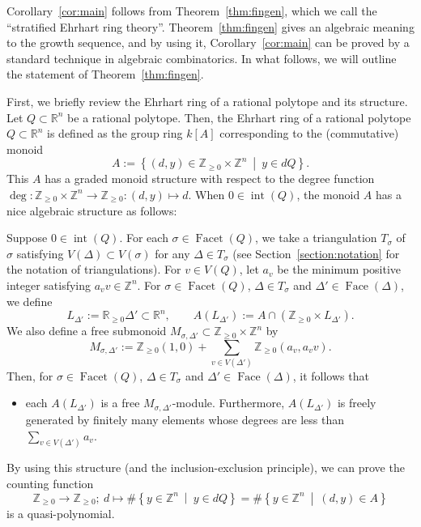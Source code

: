 Corollary~\ref{cor:main} follows from Theorem~\ref{thm:fingen}, which we call the ``stratified Ehrhart ring theory''.
Theorem~\ref{thm:fingen} gives an algebraic meaning to the growth sequence, and by using it, 
Corollary~\ref{cor:main} can be proved by a standard technique in algebraic combinatorics. 
In what follows, we will outline the statement of Theorem~\ref{thm:fingen}. 

First, we briefly review the Ehrhart ring of a rational polytope and its structure.
Let $Q \subset \mathbb{R}^n$ be a rational polytope. 
Then, the Ehrhart ring of a rational polytope $Q \subset \mathbb{R}^n$ is defined as the group ring $k[A]$ corresponding to the (commutative) monoid
\[
A := \left \{ (d, y) \in \mathbb{Z}_{\ge 0} \times \mathbb{Z}^n \ \middle | \ y \in dQ\right \}. 
\]
This $A$ has a graded monoid structure with respect to the degree function $\operatorname{deg}: \mathbb{Z}_{\ge 0} \times \mathbb{Z}^n \to \mathbb{Z}_{\ge 0}: (d,y) \mapsto d$. 
When $0 \in \operatorname{int}(Q)$, the monoid $A$ has a nice algebraic structure as follows: 
 
\begin{fact}[{cf.\ \cite[Section 3.2]{BR}}]\label{fact}
Suppose $0 \in \operatorname{int}(Q)$. 
For each $\sigma \in \operatorname{Facet}(Q)$, we take a triangulation $T_{\sigma}$ of $\sigma$ satisfying 
$V(\Delta) \subset V(\sigma)$ for any $\Delta \in T_{\sigma}$ (see Section~\ref{section:notation} for the notation of triangulations). 
For $v \in V(Q)$, let $a_v$ be the minimum positive integer satisfying $a_v v \in \mathbb{Z}^n$. 
For $\sigma \in \operatorname{Facet}(Q)$, $\Delta \in T_{\sigma}$ and $\Delta' \in \operatorname{Face}(\Delta)$, we define 
\[
L_{\Delta'} := \mathbb{R}_{\ge 0} \Delta' \subset \mathbb{R}^n, \qquad 
A \left( L_{\Delta'} \right) := A \cap \left( \mathbb{Z}_{\ge 0} \times L_{\Delta'} \right). 
\]
We also define a free submonoid $M_{\sigma , \Delta'} \subset \mathbb{Z}_{\ge 0} \times \mathbb{Z}^n$ by 
\[
M_{\sigma , \Delta'} := 
\mathbb{Z}_{\ge 0}(1,0) + 
\sum _{v \in V(\Delta')} \mathbb{Z}_{\ge 0} (a_v, a_v v). 
\]
Then, for $\sigma \in \operatorname{Facet}(Q)$, $\Delta \in T_{\sigma}$ and $\Delta' \in \operatorname{Face}(\Delta)$, it follows that 
\begin{itemize}
\item
each $A \left( L_{\Delta'} \right)$ is a free $M_{\sigma , \Delta'}$-module. 
Furthermore, $A \left( L_{\Delta'} \right)$ is freely generated by finitely many elements whose degrees are less than $\sum _{v \in V(\Delta')} a_v$. 
\end{itemize}
\end{fact}
\noindent
By using this structure (and the inclusion-exclusion principle), we can prove the counting function 
\[
\mathbb{Z}_{\ge 0} \to \mathbb{Z}_{\ge 0}; \ d \mapsto 
\# \left\{ y \in \mathbb{Z}^n \ \middle | \ y \in dQ  \right\}
= \# \left\{ y \in \mathbb{Z}^n \ \middle | \ (d,y) \in A \right\}
\]
is a quasi-polynomial. 

